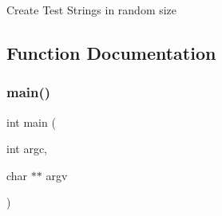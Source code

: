 Create Test Strings in random size 

\subsection{Function Documentation}
\mbox{\label{adat-devel_2other__libs_2filedb_2filehash_2createStrings_8c_a3c04138a5bfe5d72780bb7e82a18e627}} 
\subsubsection{\texorpdfstring{main()}{main()}}
{\footnotesize\ttfamily int main (\begin{DoxyParamCaption}\item[{int}]{argc,  }\item[{char $\ast$$\ast$}]{argv }\end{DoxyParamCaption})}

